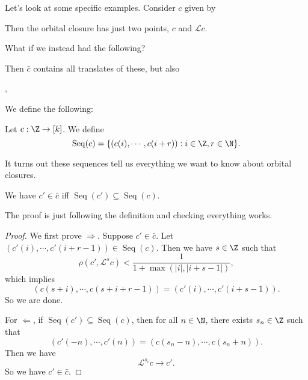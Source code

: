 \documentclass[a4paper]{article}
\DeclareMathOperator\Seq{Seq}
\begin{document}
Let's look at some specific examples. Consider $c$ given by
\begin{center}
\end{center}
Then the orbital closure has just two points, $c$ and $\mathcal{L} c$.

What if we instead had the following?
\begin{center}
\end{center}
Then $\bar{c}$ contains all translates of these, but also
\begin{center}
  ,
  \quad
\end{center}
We define the following:
\begin{defi}[$\Seq$]\index{$\Seq$}
  Let $c: \Z \to [k]$. We define
  \[
    \Seq (c) = \{(c(i), \cdots, c(i + r)): i \in \Z, r \in \N\}.
  \]
\end{defi}
It turns out these sequences tell us everything we want to know about orbital closures.

\begin{prop}
  We have $c' \in \bar{c}$ iff $\Seq(c') \subseteq \Seq(c)$.
\end{prop}
The proof is just following the definition and checking everything works.
\begin{proof}
  We first prove $\Rightarrow$. Suppose $c' \in \bar{c}$. Let $(c'(i) , \cdots, c'(i + r - 1)) \in \Seq(c)$. Then we have $s \in \Z$ such that
  \[
    \rho(c', \mathcal{L}^s c) < \frac{1}{1 + \max(|i|, |i + s - 1|)},
  \]
  which implies
  \[
    (c(s + i), \cdots, c(s + i + r - 1)) = (c'(i), \cdots, c'(i + s - 1)).
  \]
  So we are done.

  For $\Leftarrow$, if $\Seq(c') \subseteq \Seq (c)$, then for all $n \in \N$, there exists $s_n \in \Z$ such that
  \[
    (c'(-n), \cdots, c'(n)) = (c(s_n - n), \cdots, c(s_n + n)).
  \]
  Then we have
  \[
    \mathcal{L}^{s_i} c \to c'.
  \]
  So we have $c' \in \bar{c}$.
\end{proof}
\end{document}
